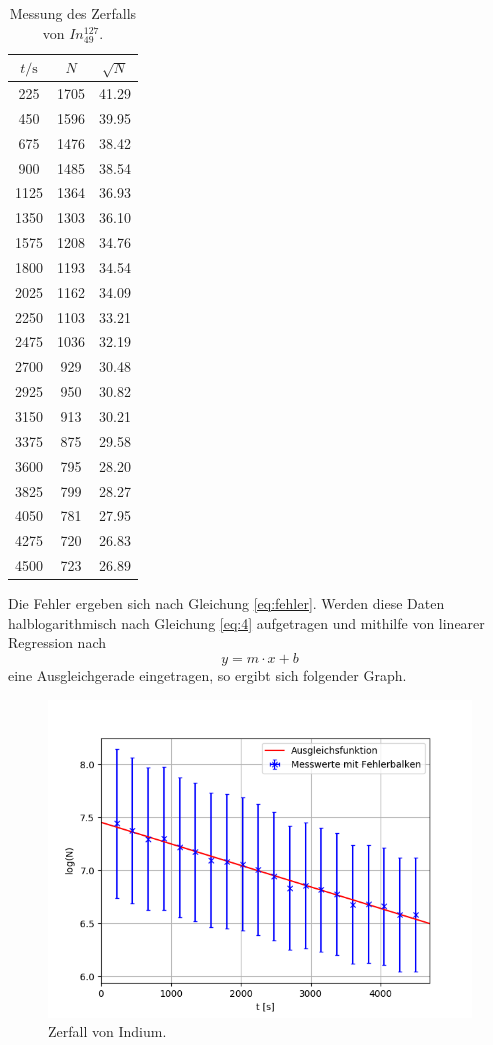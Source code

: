 \begin{table} [H]
	\centering
	\caption{Messung des Zerfalls von $In^{127}_{49}$.}
	\label{tab:Indium}
	\begin{tabular}{c|c|c}
		\toprule
		{$t / \text{s}$}&{$N$}&{$\sqrt{N}$} \\
		\midrule
		225 & 1705&41.29 \\
		450&1596&39.95\\
		675&1476&38.42\\
		900&1485&38.54\\
		1125&1364&36.93\\
		1350&1303&36.10\\
		1575&1208&34.76\\
		1800&1193&34.54\\
		2025&1162&34.09\\
		2250&1103&33.21\\
		2475&1036&32.19\\
		2700&929&30.48\\
		2925&950&30.82\\
		3150&913&30.21\\
		3375&875&29.58\\
		3600&795&28.20\\
		3825&799&28.27\\
		4050&781&27.95\\
		4275&720&26.83\\
		4500&723&26.89\\
		\bottomrule 
	\end{tabular}
\end{table} 
Die Fehler ergeben sich nach Gleichung \ref{eq:fehler}.
Werden diese Daten halblogarithmisch nach Gleichung \ref{eq:4} aufgetragen und mithilfe von linearer Regression nach
\begin{equation*}
	y = m\cdot x+b
\end{equation*}
eine Ausgleichgerade eingetragen, so ergibt sich folgender Graph.
\begin{figure}[H]
    \centering
    \includegraphics[scale=0.7]{Auswertung/Indium.png}
    \caption{Zerfall von Indium.}
    \label{fig:Indium}
\end{figure}
